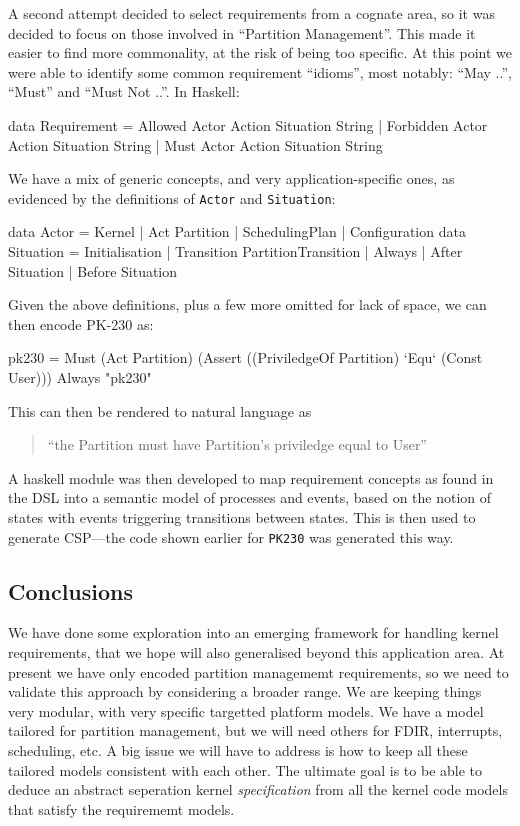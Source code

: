 A second attempt decided to select requirements from a cognate area,
so it was decided to focus on those involved in ``Partition Management''.
This made it easier to find more commonality,
at the risk of being too specific.
At this point we were able to identify some common requirement ``idioms'',
most notably: ``May ..'', ``Must'' and ``Must Not ..''.
In Haskell:
\begin{code}
data Requirement
 = Allowed Actor Action Situation String
 | Forbidden Actor Action Situation String
 | Must Actor Action Situation String
\end{code}
We have a mix of generic concepts,
and very application-specific ones, as evidenced by the definitions
of \texttt{Actor} and \texttt{Situation}:
\begin{code}
data Actor = Kernel | Act Partition
           | SchedulingPlan | Configuration
data Situation
 = Initialisation
 | Transition PartitionTransition
 | Always | After Situation | Before Situation
\end{code}
Given the above definitions, plus a few more omitted for lack of space,
we can then encode PK-230 as:
\begin{code}
pk230 =
 Must (Act Partition)
      (Assert ((PriviledgeOf Partition)
               `Equ`
               (Const User)))
      Always
      "pk230"
\end{code}
This can then be rendered to natural language as
\begin{quote}
``the Partition must have Partition's priviledge equal to User''
\end{quote}
A haskell module was then developed to map requirement concepts
as found in the DSL into a semantic model of processes and events,
based on the notion of states with events triggering transitions between states.
This is then used to generate CSP---the code shown earlier for \texttt{PK230} was generated this way.

\subsection{Conclusions}

We have done some exploration into an emerging framework for handling kernel
requirements,
that we hope will also generalised beyond this application area.
At present we have only encoded partition managememt requirements,
so we need to validate this approach by considering a broader range.
We are keeping things very modular, with very specific targetted platform models.
We have a model tailored for partition management, but we will need others
for FDIR, interrupts, scheduling, etc.
A big issue we will have to address is how to keep all these tailored models
consistent with each other.
The ultimate goal is to be able to deduce an abstract seperation kernel
\emph{specification} from all the kernel code models that satisfy the requirememt models.
